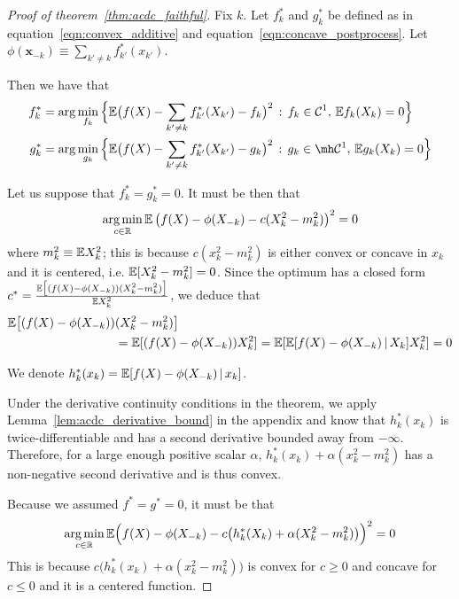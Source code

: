\begin{proof}[Proof of theorem~\ref{thm:acdc_faithful}]

Fix $k$. Let $f^*_k$ and $g^*_k$ be defined as in
equation~\ref{eqn:convex_additive} and
equation~\ref{eqn:concave_postprocess}. Let $\phi(\mathbf{x}_{-k}) \equiv \sum_{k' \neq k} f^*_{k'}(x_{k'})$.

Then we have that
\begin{align}
f^*_k &= \arg\min_{f_k} \Big\{
   \E\big( f(X) - \sum_{k' \neq k} f^*_{k'}(X_{k'}) - f_k \big)^2 
    \,:\, f_k \in  \mathcal{C}^1,\, \E f_k(X_k) = 0 
  \Big\} \\
g^*_k &= \arg\min_{g_k} \Big\{
   \E\big( f(X) - \sum_{k' \neq k} f^*_{k'}(X_{k'}) - g_k \big)^2 
    \,:\, g_k \in \mh \mathcal{C}^1,\, \E g_k(X_k) = 0 
  \Big\}
\end{align}

Let us suppose that $f^*_k = g^*_k = 0$. It must be then that
\begin{align*}
\mathop{\text{\rm arg\,min}}_{c \in {\mathbb R}} {\mathbb E} \left( f(X) - \phi(X_{-k}) - c (X_k^2 - m_k^2) \right)^2 = 0
\end{align*}
where $m_k^2 \equiv {\mathbb E} X_k^2$; this is because $c(x_k^2 - m_k^2)$ is either convex or concave in $x_k$ and it is centered, i.e. ${\mathbb E}[ X_k^2 - m_k^2] = 0$. Since the optimum has a closed form $c^* = \frac{{\mathbb E}\big[(f(X) -\phi(X_{-k}))(X_k^2 - m^2_k)\big]}{{\mathbb E} X_k^2}$, we deduce that 
\begin{align*}
{\mathbb E} \big[ (f(X) - \phi(X_{-k})) &(X_k^2 - m_k^2) \big] \\
   &= {\mathbb E}[ (f(X) - \phi(X_{-k})) X^2_k] = 
 {\mathbb E}[ {\mathbb E}[ f(X) - \phi(X_{-k}) {\,|\,} X_k] X^2_k] = 0
\end{align*}

We denote $h^*_k(x_k) = {\mathbb E}[ f(X) - \phi(X_{-k}) {\,|\,} x_k]$.

Under the derivative continuity conditions in the theorem, we apply Lemma~\ref{lem:acdc_derivative_bound} in the appendix and know that $h^*_k(x_k)$ is twice-differentiable and has a second derivative bounded away from $-\infty$. Therefore, for a large enough positive scalar $\alpha$, $h^*_k(x_k) + \alpha(x_k^2 - m_k^2)$ has a non-negative second derivative and is thus convex.

Because we assumed $f^* = g^* = 0$, it must be that
\[
\mathop{\text{\rm arg\,min}}_{c \in {\mathbb R}} 
{\mathbb E}\Big( f(X) - \phi(X_{-k}) - c\big( h^*_k(X_k) + \alpha(X_k^2 - m_k^2)\big) \Big)^2 = 0
\]
This is because $c\big( h^*_k(x_k) + \alpha(x_k^2 - m_k^2) \big)$ is convex for $c \geq 0$ and concave for $c \leq 0$ and it is a centered function.


\end{proof}
